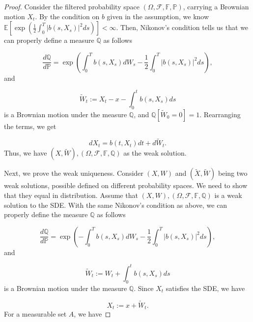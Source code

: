 \documentclass{article}
\begin{document}
\begin{proof}
Consider the filtered probability space $(\Omega, \mathcal{F},\mathbb{F}, \mathbb{P})$, carrying a Brownian motion $X_t$. By the condition on $b$ given in the assumption, we know $\mathbb{E}[\exp(\frac{1}{2}\int^T_0|b(s,X_s)|^2ds)]<\infty$. Then, Nikonov's condition tells us that we can properly define a measure $\mathbb{Q}$ as follows

\begin{equation*}
\frac{d\mathbb{Q}}{d\mathbb{P}}=\exp(\int^T_0b(s,X_s)dW_s-\frac{1}{2}\int^T_0|b(s,X_s)|^2ds),
\end{equation*}
and 

\begin{equation*}
\tilde{W}_t:=X_t-x-\int^t_0b(s,X_s)ds
\end{equation*}
is a Brownian motion under the measure $\mathbb{Q}$, and $\mathbb{Q}[\tilde{W}_0=0]=1$. Rearranging the terms, we get

\begin{equation*}
dX_t=b(t,X_t)dt+d\tilde{W}_t.
\end{equation*}
Thus, we have $(X,\tilde{W}),(\Omega,\mathcal{F},\mathbb{F}, \mathbb{Q})$ as the weak solution.

Next, we prove the weak uniqueness. Consider $(X,W)$ and $(\tilde{X},\tilde{W})$ being two weak solutions, possible defined on different probability spaces. We need to show that they equal in distribution. Assume that $(X,W),(\Omega,\mathcal{F},\mathbb{F}, \mathbb{Q})$ is a weak solution to the SDE. With the same Nikonov's condition as above, we can properly define the measure $\mathbb{Q}$ as follows

\begin{equation*}
\frac{d\mathbb{Q}}{d\mathbb{P}}=\exp(-\int^T_0b(s,X_s)dW_s-\frac{1}{2}\int^T_0|b(s,X_s)|^2ds),
\end{equation*}
and 

\begin{equation*}
\tilde{W}_t:=W_t+\int^t_0b(s,X_s)ds
\end{equation*}
is a Brownian motion under the measure $\mathbb{Q}$. Since $X_t$ satisfies the SDE, we have

\begin{equation*}
X_t:=x+\tilde{W}_t.
\end{equation*}
For a measurable set $A$, we have


\end{proof}
\end{document}
